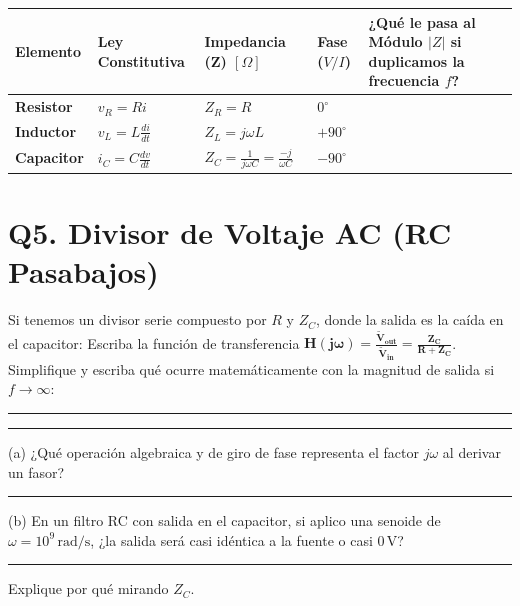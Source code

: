 \documentclass[11pt, a4paper]{article}
\begin{document}
\vspace{0.2cm}
\renewcommand{\arraystretch}{1.8}
\noindent
\begin{tabularx}{\textwidth}{
  >{\bfseries\RaggedRight\hsize=0.6\hsize}X 
  >{\centering\arraybackslash\hsize=0.8\hsize}X 
  >{\centering\arraybackslash\hsize=1.2\hsize}X 
  >{\centering\arraybackslash\hsize=0.8\hsize}X 
  >{\RaggedRight\arraybackslash\hsize=1.6\hsize}X}
\toprule
\textbf{Elemento} & \textbf{Ley Constitutiva} & \textbf{Impedancia (Z) $[\Omega]$} & \textbf{Fase ($V/I$)} & \textbf{¿Qué le pasa al Módulo $|Z|$ si duplicamos la frecuencia $f$?} \\
\midrule
Resistor & $v_R = Ri$ & $Z_R = R$ & $0^\circ$ & \\ \addlinespace
Inductor & $v_L = L \frac{di}{dt}$ & $Z_L = j\omega L$ & $+90^\circ$ & \\ \addlinespace
Capacitor & $i_C = C \frac{dv}{dt}$ & $Z_C = \frac{1}{j\omega C} = \frac{-j}{\omega C}$ & $-90^\circ$ & \\
\bottomrule
\end{tabularx}

\section*{Q5. Divisor de Voltaje AC (RC Pasabajos)}
Si tenemos un divisor serie compuesto por $R$ y $Z_C$, donde la salida es la caída en el capacitor:
Escriba la función de transferencia $\mathbf{H(j\omega) = \frac{\tilde{V}_{\text{out}}}{\tilde{V}_{\text{in}}} = \frac{Z_C}{R + Z_C}}$. Simplifique y escriba qué ocurre matemáticamente con la magnitud de salida si $f \to \infty$: \par\vspace{0.2cm}
\noindent\rule{\textwidth}{0.4pt} \par\vspace{0.2cm}
\noindent\rule{\textwidth}{0.4pt}

\vspace{0.4cm}
\begin{tcolorbox}[colback=red!5!white, colframe=red!70!black, title=\textbf{Exit Ticket (Individual)}]
\small
(a) ¿Qué operación algebraica y de giro de fase representa el factor $j\omega$ al derivar un fasor? \rule{3.5cm}{0.4pt} \par
(b) En un filtro RC con salida en el capacitor, si aplico una senoide de $\omega = 10^9\,\text{rad/s}$, ¿la salida será casi idéntica a la fuente o casi $0\,\text{V}$? \rule{3cm}{0.4pt} Explique por qué mirando $Z_C$. \par\vspace{0.2cm}
\noindent\hrulefill
\end{tcolorbox}
\end{document}
